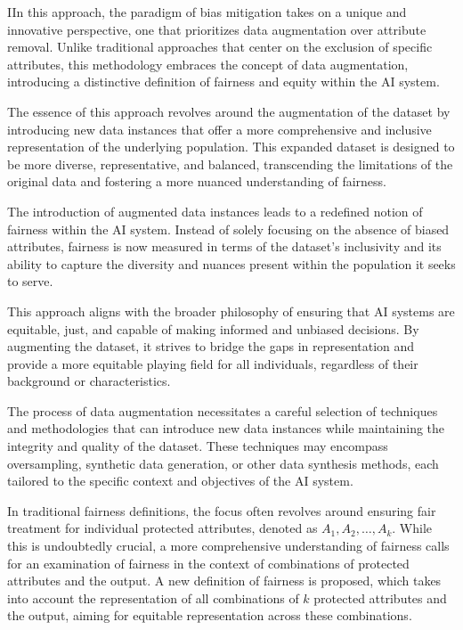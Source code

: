 IIn this approach, the paradigm of bias mitigation takes on a unique and innovative perspective, one that prioritizes data augmentation over attribute removal. Unlike traditional approaches that center on the exclusion of specific attributes, this methodology embraces the concept of data augmentation, introducing a distinctive definition of fairness and equity within the AI system.

The essence of this approach revolves around the augmentation of the dataset by introducing new data instances that offer a more comprehensive and inclusive representation of the underlying population. This expanded dataset is designed to be more diverse, representative, and balanced, transcending the limitations of the original data and fostering a more nuanced understanding of fairness. 

The introduction of augmented data instances leads to a redefined notion of fairness within the AI system. Instead of solely focusing on the absence of biased attributes, fairness is now measured in terms of the dataset's inclusivity and its ability to capture the diversity and nuances present within the population it seeks to serve. 

This approach aligns with the broader philosophy of ensuring that AI systems are equitable, just, and capable of making informed and unbiased decisions. By augmenting the dataset, it strives to bridge the gaps in representation and provide a more equitable playing field for all individuals, regardless of their background or characteristics. 

The process of data augmentation necessitates a careful selection of techniques and methodologies that can introduce new data instances while maintaining the integrity and quality of the dataset. These techniques may encompass oversampling, synthetic data generation, or other data synthesis methods, each tailored to the specific context and objectives of the AI system.

In traditional fairness definitions, the focus often revolves around ensuring fair treatment for individual protected attributes, denoted as $A_1, A_2, \ldots, A_k$. While this is undoubtedly crucial, a more comprehensive understanding of fairness calls for an examination of fairness in the context of combinations of protected attributes and the output. A new definition of fairness is proposed, which takes into account the representation of all combinations of $k$ protected attributes and the output, aiming for equitable representation across these combinations.

